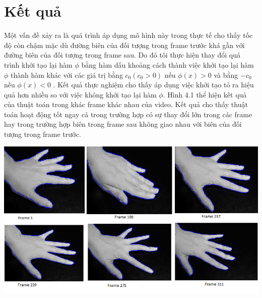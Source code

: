 \documentclass[12pt, oneside, a4]{book}
\begin{document}
\section{Kết quả}
Một vấn đề xảy ra là quá trình áp dụng  mô hình này  trong thực tế cho thấy tốc độ còn chậm mặc dù đường biên của đối tượng trong frame trước khá gần với đường biên của đối tượng trong frame sau. Do đó tôi thực hiện thay đổi quá trình khởi tạo lại hàm $\phi$ bằng hàm dấu khoảng cách thành việc khởi tạo lại hàm $\phi$ thành hàm khác với các giá trị bằng $c_0(c_0>0)$ nếu $\phi(x)>0$ và bằng $-c_0$ nếu $\phi(x)<0$ . Kết quả thực nghiệm cho thấy áp dụng việc khởi tạo  tỏ ra hiệu quả hơn nhiều so với việc không khởi tạo lại hàm $\phi$. Hình 4.1 thể hiện kết quả của thuật toán trong khác frame khác nhau của video. Kết quả cho thấy thuật toán hoạt động tốt ngay cả trong trường hợp có sự thay đổi lớn trong các frame hay trong trường hợp biên trong frame sau không giao nhau với biên của đối tượng trong frame trước.
\begin{center}
\includegraphics[scale=0.5]{figure/video1.png}
\end{center}   
\end{document}
